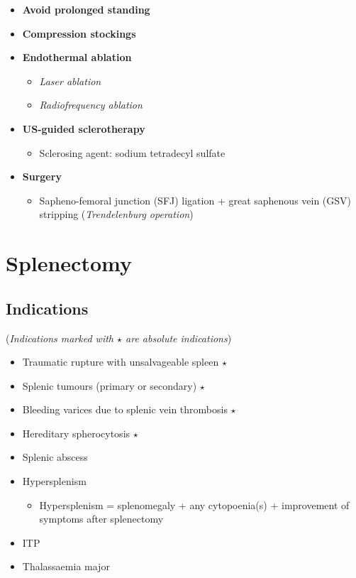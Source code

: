 \documentclass[
  12pt,
]{memoir}
\providecommand{\tightlist}{%
  \setlength{\itemsep}{0pt}\setlength{\parskip}{0pt}}
\begin{document}
\begin{itemize}
\tightlist
\item
  \textbf{Avoid prolonged standing}
\item
  \textbf{Compression stockings}
\item
  \textbf{Endothermal ablation}

  \begin{itemize}
  \tightlist
  \item
    \emph{Laser ablation}
  \item
    \emph{Radiofrequency ablation}
  \end{itemize}
\item
  \textbf{US-guided sclerotherapy}

  \begin{itemize}
  \tightlist
  \item
    Sclerosing agent: sodium tetradecyl sulfate
  \end{itemize}
\item
  \textbf{Surgery}

  \begin{itemize}
  \tightlist
  \item
    Sapheno-femoral junction (SFJ) ligation + great saphenous vein (GSV)
    stripping (\emph{Trendelenburg operation})
  \end{itemize}
\end{itemize}

\pagebreak

\hypertarget{splenectomy}{%
\chapter{Splenectomy}\label{splenectomy}}

\hypertarget{indications-2}{%
\section{Indications}\label{indications-2}}

(\emph{Indications marked with \(\star\) are absolute indications})

\begin{itemize}
\tightlist
\item
  Traumatic rupture with unsalvageable spleen \(\star\)
\item
  Splenic tumours (primary or secondary) \(\star\)
\item
  Bleeding varices due to splenic vein thrombosis \(\star\)
\item
  Hereditary spherocytosis \(\star\)
\item
  Splenic abscess
\item
  Hypersplenism

  \begin{itemize}
  \tightlist
  \item
    Hypersplenism = splenomegaly + any cytopoenia(s) + improvement of
    symptoms after splenectomy
  \end{itemize}
\item
  ITP
\item
  Thalassaemia major
\end{itemize}
\end{document}

